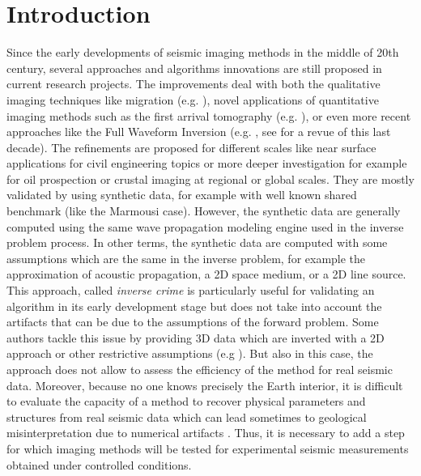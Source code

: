 \documentclass[manuscript,revised]{geophysics}
\begin{document}
\modulolinenumbers[5]
\linenumbers

\section{Introduction}


\noindent Since the early developments of seismic imaging methods in the middle of 20th century, several approaches and algorithms innovations are still proposed in current research projects. The improvements deal with both the qualitative imaging techniques like migration (e.g. \citet{Berkhout_MSS_2012,Guofeng_GPU_2013}), novel applications of quantitative imaging methods such as the first arrival tomography (e.g. \citet{Bohm_CWS_2015}), or even more recent approaches like the Full Waveform Inversion (e.g. \citet{Perez_AWI_2014}, see \citet{Virieux_FWI_2009} for a revue of this last decade). The refinements are proposed for different scales like near surface applications for civil engineering topics or more deeper investigation for example for oil prospection or crustal imaging at regional or global scales. They are mostly validated by using synthetic data, for example with well known shared benchmark (like the Marmousi case). However, the synthetic data are generally computed using the same wave propagation modeling engine used in the inverse problem process. In other terms, the synthetic data are computed with some assumptions which are the same in the inverse problem, for example the approximation of acoustic propagation, a 2D space medium, or a 2D line source. This approach, called \textit{inverse crime} \citep{Wirgin_TIC_2004} is particularly useful for validating an algorithm in its early development stage but does not take into account the artifacts that can be due to the assumptions of the forward problem. Some authors tackle this issue by providing 3D data which are inverted with a 2D approach or other restrictive assumptions (e.g ). But also in this case, the approach does not allow to assess the efficiency of the method for real seismic data. Moreover, because no one knows precisely the Earth interior, it is difficult to evaluate the capacity of a method to recover physical parameters and structures from real seismic data which can lead sometimes to geological misinterpretation due to numerical artifacts \citep{Morozov_ARF_2004}. Thus, it is necessary to add a step for which imaging methods will be tested for experimental seismic measurements obtained under controlled conditions.
\end{document}
